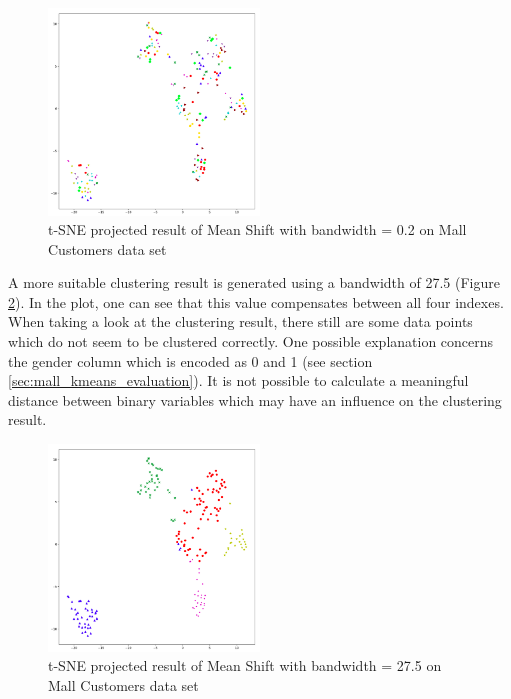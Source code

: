 \begin{figure}[!ht]
\begin{center}
\includegraphics[width=0.5\textwidth]{images/Meanshift_Mall_4_6.png}
\end{center}
\caption{t-SNE projected result of Mean Shift with bandwidth = 0.2 on Mall Customers data set}
\label{fig:meanshift_mall_4_6}
\end{figure}

A more suitable clustering result is generated using a bandwidth of 27.5 (Figure \ref{fig:meanshift_mall_27}). In the plot, one can see that this value compensates between all four indexes.
When taking a look at the clustering result, there still are some data points which do not seem to be clustered correctly. One possible explanation concerns the gender column which is encoded as 0 and 1 (see section \ref{sec:mall_kmeans_evaluation}). It is not possible to calculate a meaningful distance between binary variables which may have an influence on the clustering result. 

\begin{figure}[H]
\begin{center}
\includegraphics[width=0.5\textwidth]{images/Meanshift_Mall_27_5.png}
\caption{t-SNE projected result of Mean Shift with bandwidth = 27.5 on Mall Customers data set}
\label{fig:meanshift_mall_27}
\end{center}
\end{figure}

